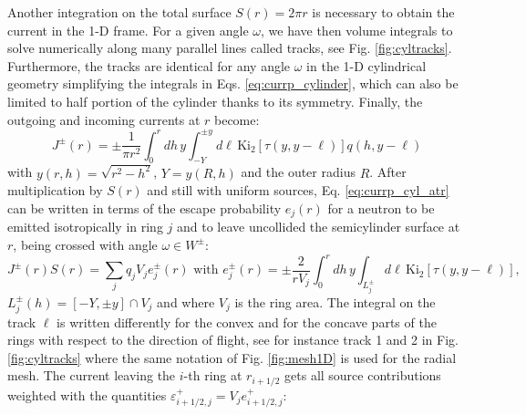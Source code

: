 \documentclass{ictt26}
\begin{document}
Another integration on the total surface $S(r) = 2\pi r$ is necessary to obtain the current in the 1-D frame. For a given angle $\omega$, we have then volume integrals to solve numerically along many parallel lines called tracks, see Fig. \ref{fig:cyltracks}. Furthermore, the tracks are identical for any angle $\omega$ in the 1-D cylindrical geometry simplifying the integrals in Eqs. \ref{eq:currp_cylinder}, which can also be limited to half portion of the cylinder thanks to its symmetry. Finally, the outgoing and incoming currents at $r$ become:
\begin{equation}
J^\pm(r) = \pm \frac{1}{\pi r^2} \int_0^r { dh\, y \int_{-Y}^{\pm y}{
  d \ell \, \text{Ki}_2\left[\tau( y, y - \ell )\right] q(h, y - \ell)}}
\label{eq:currp_cyl_atr}
\end{equation}
with $y(r,h) =\sqrt{r^2 - h^2}$, $Y = y(R,h)$ and the outer radius $R$. After multiplication by $S(r)$ and still with uniform sources, Eq. \ref{eq:currp_cyl_atr} can be written in terms of the escape probability $e_{j}(r)$ for a neutron to be emitted isotropically in ring $j$ and to leave uncollided the semicylinder surface at $r$, being crossed with angle $\omega \in W^\pm$:
\begin{equation}
J^\pm(r)S(r) = \sum_j q_j V_j e^\pm_j(r) \mbox{ with }
e^\pm_j(r) = \pm \frac{2}{r V_j} \int_0^r { dh\, y \int_{L^\pm_j}{
  d \ell \, \text{Ki}_2\left[\tau( y, y - \ell )\right]}},
\label{eq:esc_prob_cyl}
\end{equation}
$L^\pm_j(h) = [-Y,\pm y] \cap V_j$ and where $V_j$ is the ring area. The integral on the track $\ell$ is written differently for the convex and for the concave parts of the rings with respect to the direction of flight, see for instance track 1 and 2 in Fig. \ref{fig:cyltracks} where the same notation of Fig. \ref{fig:mesh1D} is used for the radial mesh. The current leaving the $i$-th ring at $r_{i+1/2}$ gets all source contributions weighted with the quantities $\varepsilon^+_{i+1/2,j} = V_j e^+_{i+1/2,j}$:
%
\newlength{\plussign}
\settowidth{\plussign}{$+$}
%
\end{document}
